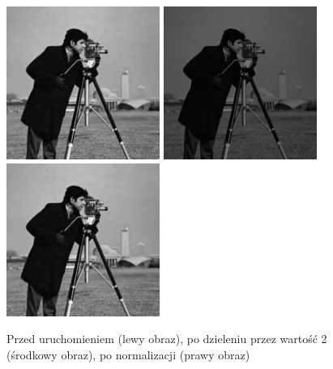 \documentclass[a4paper,12pt]{book}
\begin{document}
\begin{figure}[H]
	\caption{Przed uruchomieniem (lewy obraz), po dzieleniu przez wartość 2 (środkowy obraz), po normalizacji (prawy obraz)}
	\includegraphics[width=5cm, height=5cm]{man-unmodified.jpg}
	\includegraphics[width=5cm, height=5cm]{2-5/divide-gray-const-photoman-2.png}
	\includegraphics[width=5cm, height=5cm]{2-5/divide-gray-const-photoman-2-norm.png}
\end{figure}
\end{document}
